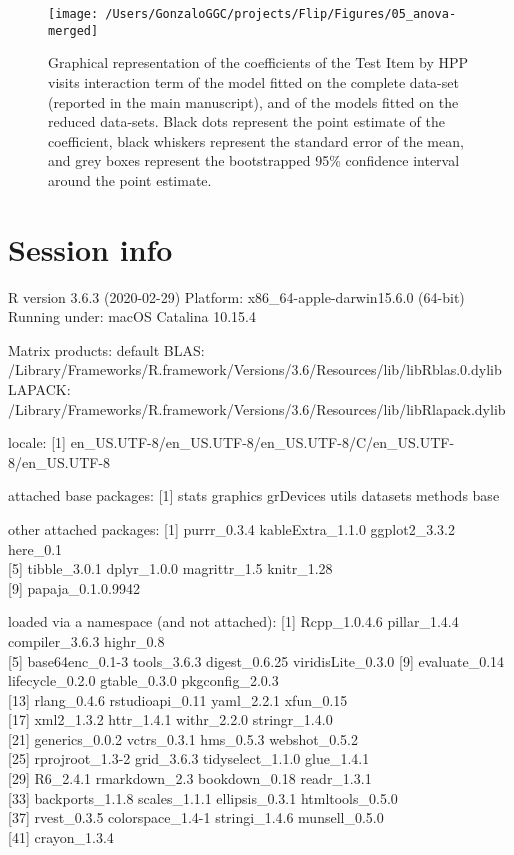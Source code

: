 \documentclass[english,man,man,floatsintext]{apa6}
\begin{document}
\begin{appendix}
\begin{figure}
\texttt{[image: /Users/GonzaloGGC/projects/Flip/Figures/05\_anova-merged]} \caption{Graphical representation of the coefficients of the Test Item by HPP visits interaction term of the model fitted on the complete data-set (reported in the main manuscript), and of the models fitted on the reduced data-sets. Black dots represent the point estimate of the coefficient, black whiskers represent the standard error of the mean, and grey boxes represent the bootstrapped 95\% confidence interval around the point estimate.}\label{fig:unnamed-chunk-16}
\end{figure}

\hypertarget{session-info}{%
\section*{Session info}\label{session-info}}

R version 3.6.3 (2020-02-29) Platform: x86\_64-apple-darwin15.6.0
(64-bit) Running under: macOS Catalina 10.15.4

Matrix products: default BLAS:
/Library/Frameworks/R.framework/Versions/3.6/Resources/lib/libRblas.0.dylib
LAPACK:
/Library/Frameworks/R.framework/Versions/3.6/Resources/lib/libRlapack.dylib

locale: {[}1{]}
en\_US.UTF-8/en\_US.UTF-8/en\_US.UTF-8/C/en\_US.UTF-8/en\_US.UTF-8

attached base packages: {[}1{]} stats graphics grDevices utils datasets
methods base

other attached packages: {[}1{]} purrr\_0.3.4 kableExtra\_1.1.0
ggplot2\_3.3.2 here\_0.1\\
{[}5{]} tibble\_3.0.1 dplyr\_1.0.0 magrittr\_1.5 knitr\_1.28\\
{[}9{]} papaja\_0.1.0.9942

loaded via a namespace (and not attached): {[}1{]} Rcpp\_1.0.4.6
pillar\_1.4.4 compiler\_3.6.3 highr\_0.8\\
{[}5{]} base64enc\_0.1-3 tools\_3.6.3 digest\_0.6.25 viridisLite\_0.3.0
{[}9{]} evaluate\_0.14 lifecycle\_0.2.0 gtable\_0.3.0 pkgconfig\_2.0.3\\
{[}13{]} rlang\_0.4.6 rstudioapi\_0.11 yaml\_2.2.1 xfun\_0.15\\
{[}17{]} xml2\_1.3.2 httr\_1.4.1 withr\_2.2.0 stringr\_1.4.0\\
{[}21{]} generics\_0.0.2 vctrs\_0.3.1 hms\_0.5.3 webshot\_0.5.2\\
{[}25{]} rprojroot\_1.3-2 grid\_3.6.3 tidyselect\_1.1.0 glue\_1.4.1\\
{[}29{]} R6\_2.4.1 rmarkdown\_2.3 bookdown\_0.18 readr\_1.3.1\\
{[}33{]} backports\_1.1.8 scales\_1.1.1 ellipsis\_0.3.1
htmltools\_0.5.0\\
{[}37{]} rvest\_0.3.5 colorspace\_1.4-1 stringi\_1.4.6 munsell\_0.5.0\\
{[}41{]} crayon\_1.3.4


\end{appendix}
\end{document}
